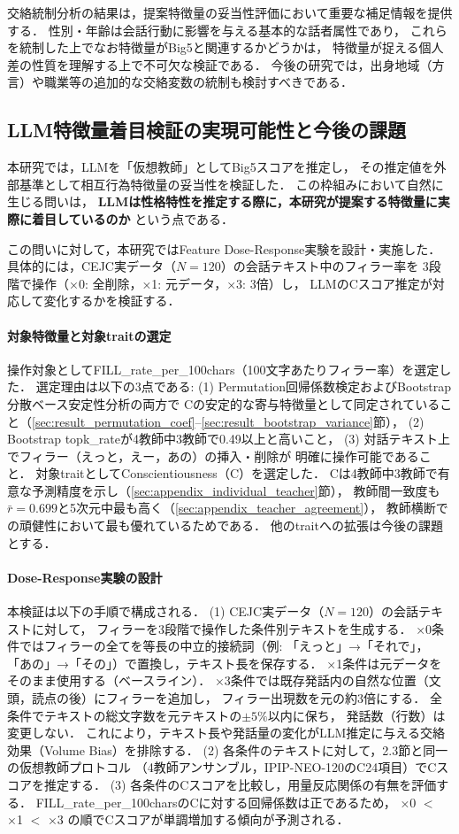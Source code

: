 \documentclass[dvipdfmx,11pt,a4paper]{bxjsarticle}
\begin{document}
交絡統制分析の結果は，提案特徴量の妥当性評価において重要な補足情報を提供する．
性別・年齢は会話行動に影響を与える基本的な話者属性であり，
これらを統制した上でなお特徴量がBig5と関連するかどうかは，
特徴量が捉える個人差の性質を理解する上で不可欠な検証である．
今後の研究では，出身地域（方言）や職業等の追加的な交絡変数の統制も検討すべきである．

\subsection{LLM特徴量着目検証の実現可能性と今後の課題}

本研究では，LLMを「仮想教師」としてBig5スコアを推定し，
その推定値を外部基準として相互行為特徴量の妥当性を検証した．
この枠組みにおいて自然に生じる問いは，
\textbf{LLMは性格特性を推定する際に，本研究が提案する特徴量に実際に着目しているのか}
という点である．

この問いに対して，本研究ではFeature Dose-Response実験を設計・実施した．
具体的には，CEJC実データ（$N = 120$）の会話テキスト中のフィラー率を
3段階で操作（×0: 全削除，×1: 元データ，×3: 3倍）し，
LLMのCスコア推定が対応して変化するかを検証する．

\paragraph{対象特徴量と対象traitの選定}
操作対象としてFILL\_rate\_per\_100chars（100文字あたりフィラー率）を選定した．
選定理由は以下の3点である:
(1) Permutation回帰係数検定およびBootstrap分散ベース安定性分析の両方で
Cの安定的な寄与特徴量として同定されていること（\ref{sec:result_permutation_coef}--\ref{sec:result_bootstrap_variance}節），
(2) Bootstrap topk\_rateが4教師中3教師で0.49以上と高いこと，
(3) 対話テキスト上でフィラー（えっと，えー，あの）の挿入・削除が
明確に操作可能であること．
対象traitとしてConscientiousness（C）を選定した．
Cは4教師中3教師で有意な予測精度を示し（\ref{sec:appendix_individual_teacher}節），
教師間一致度も$\bar{r} = 0.699$と5次元中最も高く（\ref{sec:appendix_teacher_agreement}），
教師横断での頑健性において最も優れているためである．
他のtraitへの拡張は今後の課題とする．

\paragraph{Dose-Response実験の設計}
本検証は以下の手順で構成される．
(1) CEJC実データ（$N = 120$）の会話テキストに対して，
フィラーを3段階で操作した条件別テキストを生成する．
×0条件ではフィラーの全てを等長の中立的接続詞（例: 「えっと」→「それで」，
「あの」→「その」）で置換し，テキスト長を保存する．
×1条件は元データをそのまま使用する（ベースライン）．
×3条件では既存発話内の自然な位置（文頭，読点の後）にフィラーを追加し，
フィラー出現数を元の約3倍にする．
全条件でテキストの総文字数を元テキストの$\pm 5\%$以内に保ち，
発話数（行数）は変更しない．
これにより，テキスト長や発話量の変化がLLM推定に与える交絡効果（Volume Bias）を排除する．
(2) 各条件のテキストに対して，2.3節と同一の仮想教師プロトコル
（4教師アンサンブル，IPIP-NEO-120のC24項目）でCスコアを推定する．
(3) 各条件のCスコアを比較し，用量反応関係の有無を評価する．
FILL\_rate\_per\_100charsのCに対する回帰係数は正であるため，
×0 $<$ ×1 $<$ ×3 の順でCスコアが単調増加する傾向が予測される．
\end{document}
